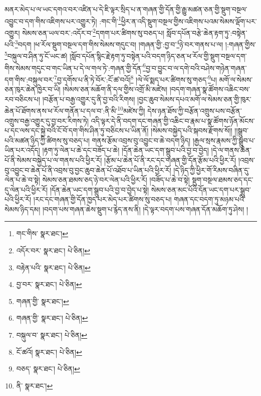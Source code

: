 མནར་མེད་པ་ལ་ཡང་དགའ་བར་འཛིན་པ་དེ་ཇི་ལྟར་སྲིད་པ་ན་གཞན་གྱི་དོན་གྱི་རྒྱུ་མཚན་ཅན་གྱི་སྡུག་བསྔལ་འབྱུང་བ་དག་གིས་འཇིགས་པར་འགྱུར་ཏེ། :གང་གི་\footnote{གང་གིས་  སྣར་ཐང་། }ཕྱིར་ན་འདི་སྡུག་བསྔལ་གྱིས་འཇིགས་པའམ་སེམས་ལྡོག་པར་འགྱུར། སེམས་ཅན་ཡལ་བར་:འདོར་བ་\footnote{འདོར་བར་  སྣར་ཐང་།  པེ་ཅིན། }དགག་པར་ཚིགས་སུ་བཅད་པ། སློབ་དཔོན་བརྩེ་ཆེན་རྟག་ཏུ་:བསྟེན་པའི་\footnote{བརྟེན་པའི་  སྣར་ཐང་།  པེ་ཅིན། }བདག །ཕ་རོལ་སྡུག་བསྔལ་དག་གིས་སེམས་གདུང་བ། །གཞན་གྱི་:བྱ་བ་\footnote{བྱ་བར་  སྣར་ཐང་།  པེ་ཅིན། }ཉེ་བར་གནས་པ་ལ། །:གཞན་གྱིས་\footnote{གཞན་གྱི་  སྣར་ཐང་། }བསྐུལ་བ་ཤིན་ཏུ་ངོ་ཡང་ཚ། །སློབ་དཔོན་སྙིང་རྗེ་རྟག་ཏུ་བསྟེན་པའི་བདག་ཉིད་ཅན་ཕ་རོལ་གྱི་སྡུག་བསྔལ་དག་གིས་སེམས་གདུང་བ་གང་ཡིན་པ་དེ་ལ་གལ་ཏེ་:གཞན་གྱི་དོན་\footnote{གཞན་གྱི་  སྣར་ཐང་།  པེ་ཅིན། }བྱ་བ་བྱུང་བ་ལ་དགེ་བའི་བཤེས་གཉེན་གཞན་དག་གིས་:བསྐུལ་བར་\footnote{བསྐུལ་བ་  སྣར་ཐང་།  པེ་ཅིན། }བྱ་དགོས་པ་ནི་ཏེ་བོར་:ངོ་ཚ་བའོ།\footnote{ངོ་ཚའོ།  སྣར་ཐང་།  པེ་ཅིན། } །ལེ་ལོ་སྨད་པར་ཚིགས་སུ་གཅད་\footnote{བཅད་  སྣར་ཐང་།  པེ་ཅིན། }པ། མགོ་ལ་སེམས་ཅན་ཁུར་ཆེན་ཁྱེར་བ་ཡི། །སེམས་ཅན་མཆོག་ནི་དལ་གྱིས་འགྲོ་མི་མཛེས། །བདག་གཞན་སྣ་ཚོགས་འཆིང་བས་རབ་བཅིངས་པ། །བརྩོན་པ་བརྒྱ་འགྱུར་དུ་ནི་བྱ་བའི་རིགས། །བྱང་ཆུབ་སེམས་དཔའ་མགོ་ལ་སེམས་ཅན་གྱི་ཁུར་ཆེན་པོ་ཐོགས་ནས་ཕ་རོལ་གནོན་པ་དལ་བ་:ནི་མི་\footnote{ནི་  སྣར་ཐང་། }མཛེས་ཀྱི། དེས་ཉན་ཐོས་ཀྱི་བརྩོན་འགྲུས་པས་བརྩོན་འགྲུས་བརྒྱ་འགྱུར་དུ་བྱ་བར་རིགས་ཏེ། འདི་ལྟར་དེ་ནི་བདག་དང་གཞན་གྱི་འཆིང་བ་རྣམ་པ་སྣ་ཚོགས་ཉོན་མོངས་པ་དང་ལས་དང་སྐྱེ་བའི་ངོ་བོ་དག་གིས་ཤིན་ཏུ་བཅིངས་པ་ཡིན་ནོ། །སེམས་བསྐྱེད་པའི་སྐབས་རྫོགས་སོ།། །།སྒྲུབ་པའི་མཚན་ཉིད་ཀྱི་ཚིགས་སུ་བཅད་པ། གནས་རྩོམ་འབྲས་བུ་འབྱུང་བ་ཆེ་བདག་ཉིད། །རྒྱལ་སྲས་རྣམས་ཀྱི་སྒྲུབ་པ་ཡིན་པར་འདོད། །རྟག་ཏུ་ལེན་པ་ཆེ་དང་བཟོད་པ་ཆེ། །དོན་ཆེན་ཡང་དག་སྒྲུབ་པའི་བྱ་བ་བྱེད། །དེ་ལ་གནས་ཆེན་པོ་ནི་སེམས་བསྐྱེད་པ་ལ་གནས་པའི་ཕྱིར་རོ། །རྩོམ་པ་ཆེན་པོ་ནི་རང་དང་གཞན་གྱི་དོན་རྩོམ་པའི་ཕྱིར་རོ། །འབྲས་བུ་འབྱུང་བ་ཆེན་པོ་ནི་འབྲས་བུ་བྱང་ཆུབ་ཆེན་པོ་འཐོབ་པ་ཡིན་པའི་ཕྱིར་རོ། །དེ་ཉིད་ཀྱི་ཕྱིར་གོ་རིམས་བཞིན་དུ་ལེན་པ་ཆེ་བ་སྟེ། སེམས་ཅན་ཐམས་ཅད་ཉེ་བར་ལེན་པའི་ཕྱིར་རོ། །བཟོད་པ་ཆེ་བ་སྟེ། སྡུག་བསྔལ་ཐམས་ཅད་དང་དུ་ལེན་པའི་ཕྱིར་རོ། །དོན་ཆེན་ཡང་དག་སྒྲུབ་པའི་བྱ་བ་བྱེད་པ་སྟེ། སེམས་ཅན་མང་པོའི་དོན་ཡང་དག་པར་སྒྲུབ་པའི་ཕྱིར་རོ། །རང་དང་གཞན་གྱི་དོན་ཁྱད་པར་མེད་པར་ཚིགས་སུ་བཅད་པ། གཞན་དང་བདག་ཏུ་མཉམ་པའི་སེམས་ཉིད་དམ། །བདག་པས་གཞན་ཆེས་སྡུག་པ་རྙེད་ནས་ནི། །དེ་ལྟར་བདག་པས་གཞན་དོན་མཆོག་ཏུ་ཤེས། །
